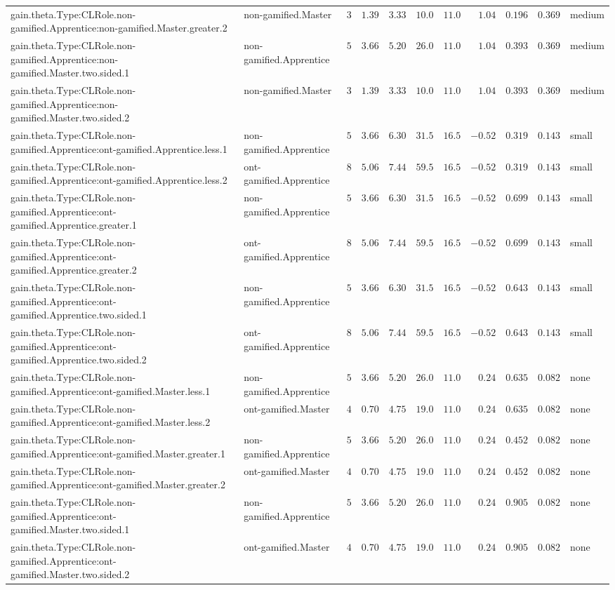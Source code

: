 \documentclass[6pt]{article}
\begin{document}
\begin{landscape}
{\begin{longtable}{llrrrrrrrrl}
gain.theta.Type:CLRole.non-gamified.Apprentice:non-gamified.Master.greater.2&non-gamified.Master&$ 3$&$1.39$&$ 3.33$&$ 10.0$&$11.0$&$ 1.04$&$0.196$&$0.369$&medium\tabularnewline
gain.theta.Type:CLRole.non-gamified.Apprentice:non-gamified.Master.two.sided.1&non-gamified.Apprentice&$ 5$&$3.66$&$ 5.20$&$ 26.0$&$11.0$&$ 1.04$&$0.393$&$0.369$&medium\tabularnewline
gain.theta.Type:CLRole.non-gamified.Apprentice:non-gamified.Master.two.sided.2&non-gamified.Master&$ 3$&$1.39$&$ 3.33$&$ 10.0$&$11.0$&$ 1.04$&$0.393$&$0.369$&medium\tabularnewline
gain.theta.Type:CLRole.non-gamified.Apprentice:ont-gamified.Apprentice.less.1&non-gamified.Apprentice&$ 5$&$3.66$&$ 6.30$&$ 31.5$&$16.5$&$-0.52$&$0.319$&$0.143$&small\tabularnewline
gain.theta.Type:CLRole.non-gamified.Apprentice:ont-gamified.Apprentice.less.2&ont-gamified.Apprentice&$ 8$&$5.06$&$ 7.44$&$ 59.5$&$16.5$&$-0.52$&$0.319$&$0.143$&small\tabularnewline
gain.theta.Type:CLRole.non-gamified.Apprentice:ont-gamified.Apprentice.greater.1&non-gamified.Apprentice&$ 5$&$3.66$&$ 6.30$&$ 31.5$&$16.5$&$-0.52$&$0.699$&$0.143$&small\tabularnewline
gain.theta.Type:CLRole.non-gamified.Apprentice:ont-gamified.Apprentice.greater.2&ont-gamified.Apprentice&$ 8$&$5.06$&$ 7.44$&$ 59.5$&$16.5$&$-0.52$&$0.699$&$0.143$&small\tabularnewline
gain.theta.Type:CLRole.non-gamified.Apprentice:ont-gamified.Apprentice.two.sided.1&non-gamified.Apprentice&$ 5$&$3.66$&$ 6.30$&$ 31.5$&$16.5$&$-0.52$&$0.643$&$0.143$&small\tabularnewline
gain.theta.Type:CLRole.non-gamified.Apprentice:ont-gamified.Apprentice.two.sided.2&ont-gamified.Apprentice&$ 8$&$5.06$&$ 7.44$&$ 59.5$&$16.5$&$-0.52$&$0.643$&$0.143$&small\tabularnewline
gain.theta.Type:CLRole.non-gamified.Apprentice:ont-gamified.Master.less.1&non-gamified.Apprentice&$ 5$&$3.66$&$ 5.20$&$ 26.0$&$11.0$&$ 0.24$&$0.635$&$0.082$&none\tabularnewline
gain.theta.Type:CLRole.non-gamified.Apprentice:ont-gamified.Master.less.2&ont-gamified.Master&$ 4$&$0.70$&$ 4.75$&$ 19.0$&$11.0$&$ 0.24$&$0.635$&$0.082$&none\tabularnewline
gain.theta.Type:CLRole.non-gamified.Apprentice:ont-gamified.Master.greater.1&non-gamified.Apprentice&$ 5$&$3.66$&$ 5.20$&$ 26.0$&$11.0$&$ 0.24$&$0.452$&$0.082$&none\tabularnewline
gain.theta.Type:CLRole.non-gamified.Apprentice:ont-gamified.Master.greater.2&ont-gamified.Master&$ 4$&$0.70$&$ 4.75$&$ 19.0$&$11.0$&$ 0.24$&$0.452$&$0.082$&none\tabularnewline
gain.theta.Type:CLRole.non-gamified.Apprentice:ont-gamified.Master.two.sided.1&non-gamified.Apprentice&$ 5$&$3.66$&$ 5.20$&$ 26.0$&$11.0$&$ 0.24$&$0.905$&$0.082$&none\tabularnewline
gain.theta.Type:CLRole.non-gamified.Apprentice:ont-gamified.Master.two.sided.2&ont-gamified.Master&$ 4$&$0.70$&$ 4.75$&$ 19.0$&$11.0$&$ 0.24$&$0.905$&$0.082$&none\tabularnewline

\end{longtable}}
\end{landscape}
\end{document}
